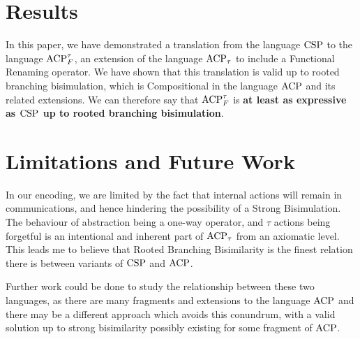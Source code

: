 \documentclass[../hons_project.tex]{subfiles}
\begin{document}
\section{Results}
In this paper, we have demonstrated a translation from the language $\mathrm{CSP}$ to the language $\mathrm{ACP}_{F}^{\tau}$, an extension of the language $\mathrm{ACP}_{\tau}$ to include a Functional Renaming operator. We have shown that this translation is valid up to rooted branching bisimulation, which is Compositional in the language $\mathrm{ACP}$ and its related extensions. We can therefore say that $\mathrm{ACP}_{F}^{\tau}$ is \textbf{at least as expressive as $\mathrm{CSP}$ up to rooted branching bisimulation}.

\section{Limitations and Future Work}
In our encoding, we are limited by the fact that internal actions will remain in communications, and hence hindering the possibility of a Strong Bisimulation. The behaviour of abstraction being a one-way operator, and $\tau$ actions being forgetful is an intentional and inherent part of $\mathrm{ACP}_{\tau}$ from an axiomatic level. This leads me to believe that Rooted Branching Bisimilarity is the finest relation there is between variants of $\mathrm{CSP}$ and $\mathrm{ACP}$.
    
Further work could be done to study the relationship between these two languages, as there are many fragments and extensions to the language $\mathrm{ACP}$ and there may be a different approach which avoids this conundrum, with a valid solution up to strong bisimilarity possibly existing for some fragment of $\mathrm{ACP}$.
\end{document}
